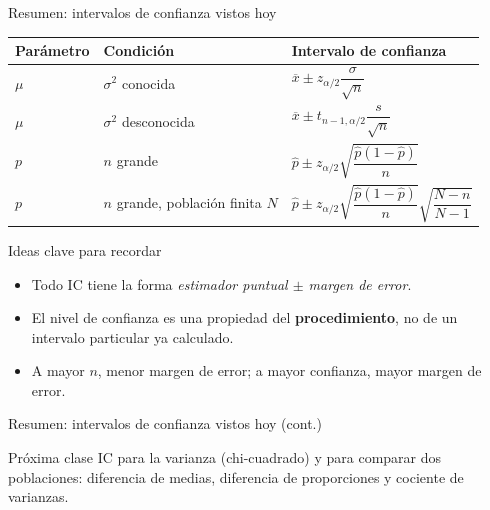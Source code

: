 \documentclass[aspectratio=169,11pt]{beamer}
\begin{document}
\begin{frame}{Resumen: intervalos de confianza vistos hoy}
\begin{center}
\small
\begin{tabular}{lll}
\toprule
\textbf{Parámetro} & \textbf{Condición} & \textbf{Intervalo de confianza} \\
\midrule
$\mu$ & $\sigma^2$ conocida & $\overline x \pm z_{\alpha/2}\dfrac{\sigma}{\sqrt n}$ \\[1.2ex]
$\mu$ & $\sigma^2$ desconocida & $\overline x \pm t_{n-1,\alpha/2}\dfrac{s}{\sqrt n}$ \\[1.2ex]
$p$ & $n$ grande & $\widehat p \pm z_{\alpha/2}\sqrt{\dfrac{\widehat p(1-\widehat p)}{n}}$ \\[1.2ex]
$p$ & $n$ grande, población finita $N$ & $\widehat p \pm z_{\alpha/2}\sqrt{\dfrac{\widehat p(1-\widehat p)}{n}}\sqrt{\dfrac{N-n}{N-1}}$ \\
\bottomrule
\end{tabular}
\end{center}

\begin{block}{Ideas clave para recordar}
\begin{itemize}
\item Todo IC tiene la forma \emph{estimador puntual $\pm$ margen de error}.
\item El nivel de confianza es una propiedad del \textbf{procedimiento}, no de un intervalo particular ya calculado.
\item A mayor $n$, menor margen de error; a mayor confianza, mayor margen de error.
\end{itemize}
\end{block}

\end{frame}

\begin{frame}{Resumen: intervalos de confianza vistos hoy (cont.)}
\begin{alertblock}{Próxima clase}
IC para la varianza (chi-cuadrado) y para comparar dos poblaciones: diferencia de medias, diferencia de proporciones y cociente de varianzas.
\end{alertblock}
\end{frame}
\end{document}
